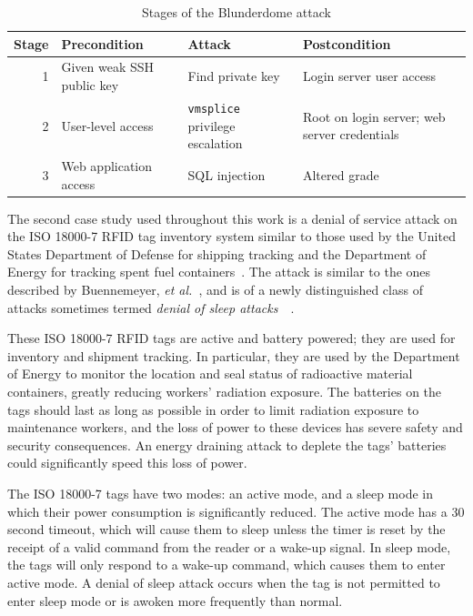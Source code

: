 \begin{table}
\centering
\begin{tabular}{r|p{1.25in}|p{1.35in}|p{1.75in}}
Stage & Precondition	&	Attack	&	Postcondition \\ \hline \hline
1 & \raggedright Given weak SSH public key
	& \raggedright Find private key &  Login server user access \\ \hline
2 & \raggedright User-level access & \raggedright \texttt{vmsplice} privilege escalation 
	& Root on login server; web server credentials \\ \hline
3 & \raggedright Web application access & \raggedright SQL injection & Altered grade
\end{tabular}
\caption{Stages of the Blunderdome attack}
\label{table:blundertasks}
\end{table}
\label{sec:bg:rfid}
The second case study used throughout this work is a denial of service attack
on the ISO 18000-7 RFID tag inventory system similar to those used by the United States
Department of Defense for shipping tracking and the Department of Energy for tracking spent
fuel containers~\cite{chen2009radiofrequency}. The attack
is similar to the ones described by Buennemeyer, \emph{et al.}~\cite{buennemeyer2006battery},
and is of a newly distinguished class of attacks sometimes termed \emph{denial
of sleep attacks}~\cite{brownfield2005wireless}~\cite{raymond2009effects}.

These ISO 18000-7 RFID tags are active and battery powered; they are used for inventory and
shipment tracking. In particular, they are used by the Department of Energy to monitor
the location and seal status of
radioactive material containers, greatly reducing workers' radiation exposure. 
The batteries on the tags should last as long as
possible in order to limit radiation exposure to maintenance workers, and
the loss of power to these devices has severe safety and security consequences.
An energy draining attack to deplete the tags' batteries could significantly
speed this loss of power.

The ISO 18000-7 tags have two modes: an active mode, and a sleep mode in which their
power consumption is significantly reduced. The active mode has a 30 second timeout,
which will cause them to sleep unless the timer is reset by the receipt of a valid
command from the reader or a wake-up signal. In sleep mode, the tags will only respond to a
wake-up command, which causes them to enter active mode.
A denial of sleep attack occurs when the tag is not permitted to enter sleep mode or is
awoken more frequently than normal.

